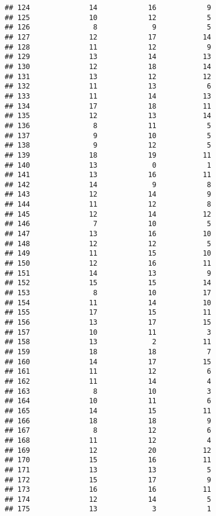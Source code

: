 \documentclass[
]{article}
\begin{document}
\begin{verbatim}
## 124              14            16            9
## 125              10            12            5
## 126               8             9            5
## 127              12            17           14
## 128              11            12            9
## 129              13            14           13
## 130              12            18           14
## 131              13            12           12
## 132              11            13            6
## 133              11            14           13
## 134              17            18           11
## 135              12            13           14
## 136               8            11            5
## 137               9            10            5
## 138               9            12            5
## 139              18            19           11
## 140              13             0            1
## 141              13            16           11
## 142              14             9            8
## 143              12            14            9
## 144              11            12            8
## 145              12            14           12
## 146               7            10            5
## 147              13            16           10
## 148              12            12            5
## 149              11            15           10
## 150              12            16           11
## 151              14            13            9
## 152              15            15           14
## 153               8            10           17
## 154              11            14           10
## 155              17            15           11
## 156              13            17           15
## 157              10            11            3
## 158              13             2           11
## 159              18            18            7
## 160              14            17           15
## 161              11            12            6
## 162              11            14            4
## 163               8            10            3
## 164              10            11            6
## 165              14            15           11
## 166              18            18            9
## 167               8            12            6
## 168              11            12            4
## 169              12            20           12
## 170              15            16           11
## 171              13            13            5
## 172              15            17            9
## 173              16            16           11
## 174              12            14            5
## 175              13             3            1

\end{verbatim}
\end{document}
